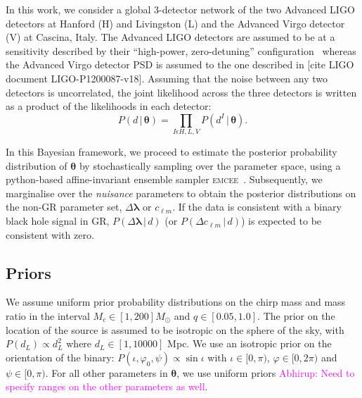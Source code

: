 \documentclass[prd,preprintnumbers,twocolumn,eqsecnum,floatfix,a4paper,nofootinbib,superscriptaddress]{revtex4}
\newcommand{\abhirup}[1]{\textcolor{magenta}{Abhirup: #1}}
\newcommand{\blambda}{\bm{\lambda}}
\newcommand{\btheta}{\bm{\theta}}
\begin{document}
In this work, we consider a global 3-detector network of the two Advanced LIGO detectors at Hanford (H) and Livingston (L) and the Advanced Virgo detector (V) at Cascina, Italy. The Advanced LIGO detectors are assumed to be at a sensitivity described by their ``high-power, zero-detuning'' configuration~\cite{aLIGOZeroDetHighPower} whereas the Advanced Virgo detector PSD is assumed to the one described in [cite LIGO document LIGO-P1200087-v18]. Assuming that the noise between any two detectors is uncorrelated, the joint likelihood across the three detectors is written as a product of the likelihoods in each detector:
\begin{equation}
P (d \, | \, {\btheta}) = \prod_{I \epsilon {H,L,V}} P (d^{I} \, | \, {\btheta}).
\end{equation}

In this Bayesian framework, we proceed to estimate the posterior probability distribution of $\btheta$ by stochastically sampling over the parameter space, using a python-based affine-invariant ensemble sampler \textsc{emcee}~\cite{foreman2013emcee, goodman2010ensemble}. Subsequently, we marginalise over the \textit{nuisance} parameters to obtain the posterior distributions on the non-GR parameter set, ${\Delta \blambda}$ or $c_{\ell m}$. If the data is consistent with a binary black hole signal in GR, $P(\Delta \blambda \, | \, d)$ (or $P(\Delta c_{\ell m} \, | \, d)$) is expected to be consistent with zero. 

\subsection{Priors}
\label{sec:priors}

We assume uniform prior probability distributions on the chirp mass and mass ratio in the interval $M_c \in [1,200] M_\odot$ and $q \in [0.05,1.0]$. The prior on the location of the source is  assumed to be isotropic on the sphere of  the  sky,  with $P({d_L}) \propto d_{L}^{2}$ where $d_L \in [1,10000]$ Mpc. We use an  isotropic  prior  on  the  orientation  of  the  binary: $P({\iota,\varphi_0,\psi}) \propto \sin\iota$ with $\iota \in [0,\pi)$, $\varphi \in [0,2\pi)$ and $\psi \in [0,\pi)$. For all other parameters in $\btheta$, we use uniform priors \abhirup{Need to specify ranges on the other parameters as well}.
\end{document}
